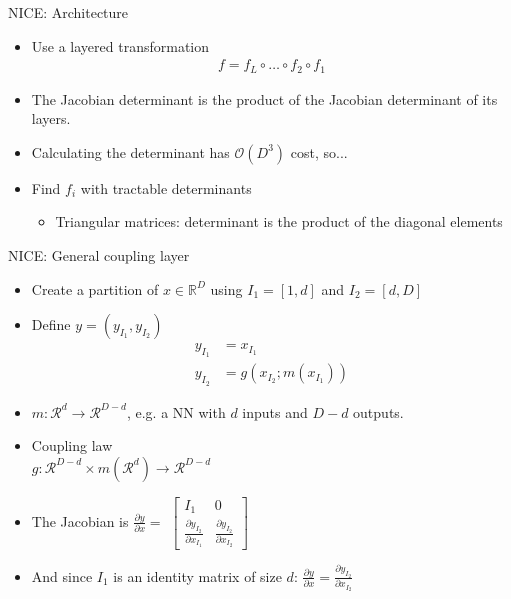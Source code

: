 \begin{frame}{NICE: Architecture}
\begin{itemize}
    \item Use a layered transformation
    \begin{align*}
        f = f_L \circ \dots \circ f_2 \circ f_1
    \end{align*}
    \item The Jacobian determinant is the product of the Jacobian determinant of its layers.
    \item Calculating the determinant has $\mathcal{O}(D^3)$ cost, so...
    \item Find $f_i$ with tractable determinants
    \begin{itemize}
        \item Triangular matrices: determinant is the product of the diagonal elements
    \end{itemize}
\end{itemize}
\end{frame}

\begin{frame}{NICE: General coupling layer}
    \begin{itemize}
        \item Create a partition of $x \in \mathbb{R}^D$ using $I_1 = [1, d]$ and $I_2 = [d, D]$
        \item Define $y = (y_{I_1}, y_{I_2})$
            \begin{align*}
                y_{I_1} &= x_{I_1} \\
                y_{I_2} &= g(x_{I_2}; m(x_{I_1}))
            \end{align*}
        \item $m : \mathcal{R}^d \longrightarrow \mathcal{R}^{D-d}$, e.g. a NN with $d$ inputs and $D-d$ outputs.
        \item Coupling law \\
        $g : \mathcal{R}^{D-d} \times m(\mathcal{R}^d) \longrightarrow \mathcal{R}^{D-d}$
        \item The Jacobian is $\frac{\partial y}{\partial x} =$
        $\begin{bmatrix}
            I_1 & 0 \\
            \frac{\partial y_{I_2}}{\partial x_{I_1}} &  \frac{\partial y_{I_2}}{\partial x_{I_2}}
        \end{bmatrix}$
        \item And since $I_1$ is an identity matrix of size $d$: $\frac{\partial y}{\partial x} = \frac{\partial y_{I_2}}{\partial x_{I_2}}$
    \end{itemize}
\end{frame}

